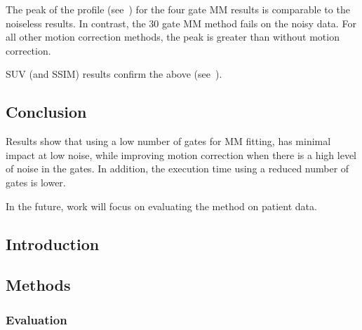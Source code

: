             The peak of the profile (see~) for the four gate \gls{MM} results is comparable to the noiseless results. In contrast, the $30$ gate \gls{MM} method fails on the noisy data. For all other motion correction methods, the peak is greater than without motion correction.
             
            \gls{SUV} (and \gls{SSIM}) results confirm the above (see~).

        \subsection{Conclusion} \label{sec:pet_ct_motion_correction_exploiting_motion_models_fit_on_coarsely_gated_data_applied_to_finely_gated_data_conclusion}
            Results show that using a low number of gates for \gls{MM} fitting, has minimal impact at low noise, while improving motion correction when there is a high level of noise in the gates. In addition, the execution time using a reduced number of gates is lower.
            
            In the future, work will focus on evaluating the method on patient data.



        \subsection{Introduction} \label{sec:test_introduction}
            
        
        \subsection{Methods} \label{sec:test_methods}
            
            
            \subsubsection{Evaluation} \label{sec:test_methods_evaluation}
                
        
